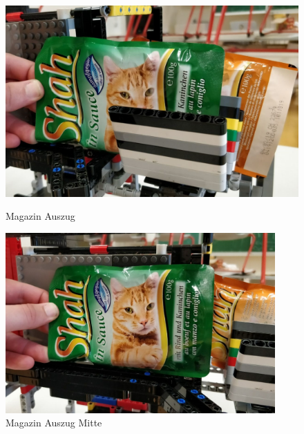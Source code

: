 \begin{figure}[H]
   \begin{minipage}[hbt]{0.5\textwidth} %
      \includegraphics[width=1\textwidth]{Bilder/Ablauf_1_png/Magazin_Auszug}
      \caption{Magazin Auszug}
      \label{Magazin Auszug}
   \end{minipage}
   \hspace{.04\linewidth}%
   \begin{minipage}[hbt]{0.5\textwidth} %
      \includegraphics[width=0.92\textwidth]{Bilder/Ablauf_1_png/Magazin_Auszug_2}
      \caption{Magazin Auszug Mitte}
	  \label{Magazin Mitte}      
      \end{minipage}
\end{figure}

\vspace{20pt}

